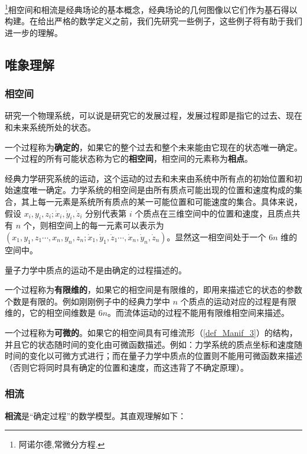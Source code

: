 
\begin{issues}
\end{issues}

\footnote{阿诺尔德,常微分方程.}相空间和相流是经典场论的基本概念，经典场论的几何图像以它们作为基石得以构建。在给出严格的数学定义之前，我们先研究一些例子，这些例子将有助于我们进一步的理解。
\subsection{唯象理解}
\subsubsection{相空间}
研究一个物理系统，可以说是研究它的发展过程，发展过程即是指它的过去、现在和未来系统所处的状态。

一个过程称为\textbf{确定的}，如果它的整个过去和整个未来能由它现在的状态唯一确定。一个过程的所有可能状态称为它的\textbf{相空间}，相空间的元素称为\textbf{相点}。

\begin{example}{}
经典力学研究系统的运动，这个运动的过去和未来由系统中所有点的初始位置和初始速度唯一确定。力学系统的相空间是由所有质点可能出现的位置和速度构成的集合，其上每一元素是系统所有质点的某一可能位置和可能速度的集合。具体来说，假设 $x_{i},y_i,z_i;\dot{x}_i,\dot{y}_i,\dot z_i$ 分别代表第 $i$ 个质点在三维空间中的位置和速度，且质点共有 $n$ 个，则相空间上的每一元素可以表示为 $(x_1,y_1,z_1\cdots,x_n,y_n,z_n;\dot x _1,\dot y_1,\dot z_1\cdots,\dot x_n,\dot y_n,\dot z_n)$。显然这一相空间处于一个 $6n$ 维的空间中。

量子力学中质点的运动不是由确定的过程描述的。
\end{example}

一个过程称为\textbf{有限维的}，如果它的相空间是有限维的，即用来描述它的状态的参数个数是有限的。例如刚刚例子中的经典力学中 $n$ 个质点的运动对应的过程是有限维的，它的相空间维数是 $6n$。而流体运动的过程不能用有限维相空间来描述。

一个过程称为\textbf{可微的}。如果它的相空间具有可维流形（\autoref{def_Manif_3}）的结构，并且它的状态随时间的变化由可微函数描述。例如：力学系统的质点坐标和速度随时间的变化以可微方式进行；而在量子力学中质点的位置则不能用可微函数来描述（否则它将同时具有确定的位置和速度，而这违背了不确定原理）。
\subsubsection{相流}
\textbf{相流}是“确定过程”的数学模型。其直观理解如下：

